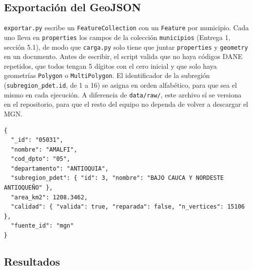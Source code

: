 \documentclass[11pt,a4paper]{article}
\newcommand{\campo}[1]{\texttt{#1}}
\begin{document}
\subsection{Exportación del GeoJSON}
\label{sec:geometria-exportar}

\campo{exportar.py} escribe un \campo{FeatureCollection} con un
\campo{Feature} por municipio. Cada uno lleva en \campo{properties} los
campos de la colección \campo{municipios} (Entrega 1, sección 5.1), de modo
que \campo{carga.py} solo tiene que juntar \campo{properties} y
\campo{geometry} en un documento. Antes de escribir, el script valida que
no haya códigos DANE repetidos, que todos tengan 5 dígitos con el cero
inicial y que solo haya geometrías \campo{Polygon} o \campo{MultiPolygon}.
El identificador de la subregión (\campo{subregion\_pdet.id}, de 1 a 16)
se asigna en orden alfabético, para que sea el mismo en cada ejecución.
A diferencia de \campo{data/raw/}, este archivo sí se versiona en el
repositorio, para que el resto del equipo no dependa de volver a
descargar el MGN.

\begin{lstlisting}[caption={Propiedades de un municipio en el GeoJSON exportado (se omite la geometría).}]
{
  "_id": "05031",
  "nombre": "AMALFI",
  "cod_dpto": "05",
  "departamento": "ANTIOQUIA",
  "subregion_pdet": { "id": 3, "nombre": "BAJO CAUCA Y NORDESTE ANTIOQUEÑO" },
  "area_km2": 1208.3462,
  "calidad": { "valida": true, "reparada": false, "n_vertices": 15106 },
  "fuente_id": "mgn"
}
\end{lstlisting}

\subsection{Resultados}
\label{sec:geometria-resultados}
\end{document}
